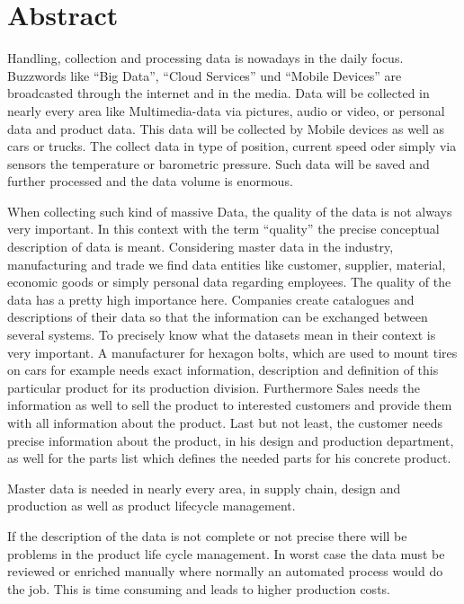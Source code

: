 \chapter*{Abstract}


Handling, collection and processing data is nowadays in the daily focus. Buzzwords like \enquote{Big Data}, \enquote{Cloud Services} und \enquote{Mobile Devices} are broadcasted through the internet and in the media. Data will be collected in nearly every area like Multimedia-data via pictures, audio or video, or personal data and product data. This data will be collected by Mobile devices as well as cars or trucks. The collect data in type of position, current speed oder simply via sensors the temperature or barometric pressure. Such data will be saved and further processed and the data volume is enormous. 

When collecting such kind of massive Data, the quality of the data is not always very important. In this context with the term \enquote{quality} the precise conceptual description of data is meant. Considering master data in the industry, manufacturing and trade we find data entities like customer, supplier, material, economic goods or simply personal data regarding employees. The quality of the data has a pretty high importance here. Companies create catalogues and descriptions of their data so that the information can be exchanged between several systems. To precisely know what the datasets mean in their context is very important. A manufacturer for hexagon bolts, which are used to mount tires on cars for example needs exact information, description and definition of this particular product for its production division. Furthermore Sales needs the information as well to sell the product to interested customers and provide them with all information about the product. Last but not least, the customer needs precise information about the product, in his design and production department, as well for the parts list which defines the needed parts for his concrete product. 

Master data is needed in nearly every area, in supply chain, design and production as well as product lifecycle management. 

If the description of the data is not complete or not precise there will be problems in the product life cycle management. In worst case the data must be reviewed or enriched manually where normally an automated process would do the job. This is time consuming and leads to higher production costs.   

